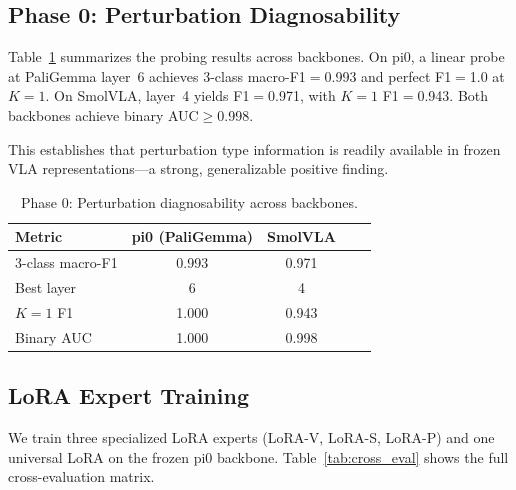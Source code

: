 \documentclass[letterpaper]{article}
\begin{document}
\subsection{Phase 0: Perturbation Diagnosability}
\label{sec:exp_phase0}

Table~\ref{tab:phase0} summarizes the probing results across backbones.
On pi0, a linear probe at PaliGemma layer~6 achieves 3-class macro-F1$=$0.993 and perfect F1$=$1.0 at $K{=}1$.
On SmolVLA, layer~4 yields F1$=$0.971, with $K{=}1$ F1$=$0.943.
Both backbones achieve binary AUC$\geq$0.998.

This establishes that perturbation type information is readily available in frozen VLA representations---a strong, generalizable positive finding.

\begin{table}[h]
\centering
\caption{Phase 0: Perturbation diagnosability across backbones.}
\label{tab:phase0}
\begin{tabular}{lcccc}
\toprule
Metric & pi0 (PaliGemma) & SmolVLA \\
\midrule
3-class macro-F1 & 0.993 & 0.971 \\
Best layer & 6 & 4 \\
$K{=}1$ F1 & 1.000 & 0.943 \\
Binary AUC & 1.000 & 0.998 \\
\bottomrule
\end{tabular}
\end{table}

\subsection{LoRA Expert Training}
\label{sec:exp_experts}

We train three specialized LoRA experts (LoRA-V, LoRA-S, LoRA-P) and one universal LoRA on the frozen pi0 backbone.
Table~\ref{tab:cross_eval} shows the full cross-evaluation matrix.
\end{document}
